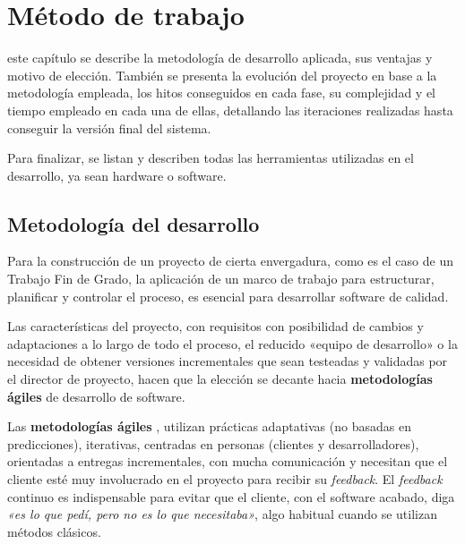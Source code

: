 \chapter{Método de trabajo}
\label{chap:metodo}

 este capítulo se describe la metodología de desarrollo aplicada, sus ventajas y motivo de elección. También se presenta la evolución del proyecto en base a la metodología empleada, los hitos conseguidos en cada fase, su complejidad y el tiempo empleado en cada una de ellas, detallando las iteraciones realizadas hasta conseguir la versión final del sistema.

Para finalizar, se listan y describen todas las herramientas utilizadas en el desarrollo, ya sean hardware o software.

\section{Metodología del desarrollo}
Para la construcción de un proyecto de cierta envergadura, como es el caso de un Trabajo Fin de Grado, la aplicación de un marco de trabajo para estructurar, planificar y controlar el proceso, es esencial para desarrollar software de calidad.

Las características del proyecto, con requisitos con posibilidad de cambios y adaptaciones a lo largo de todo el proceso, el reducido «equipo de desarrollo» o la necesidad de obtener versiones incrementales que sean testeadas y validadas por el director de proyecto, hacen que la elección se decante hacia \textbf{metodologías ágiles} de desarrollo de software.

Las \textbf{metodologías ágiles} \cite{Ubeda}, utilizan prácticas adaptativas (no basadas en predicciones), iterativas, centradas en personas (clientes y desarrolladores), orientadas a entregas incrementales, con mucha comunicación y  necesitan que el cliente esté muy involucrado en el proyecto para recibir su \textit{feedback}. El \textit{feedback} continuo es indispensable para evitar que el cliente, con el software acabado, diga \textit{«es lo que pedí, pero no es lo que necesitaba»}, algo habitual cuando se utilizan métodos clásicos.

